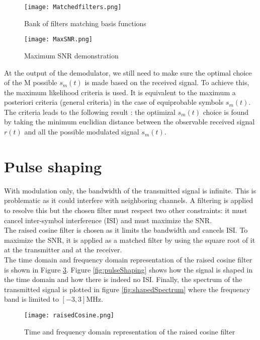  \begin{figure}[H]
    \centering
    \texttt{[image: Matchedfilters.png]}
    \caption{Bank of filters matching basis functions}
    \label{fig:Matchedfilters}
\end{figure}

\begin{figure}[H]
    \centering
    \texttt{[image: MaxSNR.png]}
    \caption{Maximum SNR demonstration}
    \label{fig:MaxSNR}
\end{figure}

At the output of the demodulator, we still need to make sure the optimal choice of the M possible $s_m(t)$ is made based on the received signal.
To achieve this, the maximum likelihood criteria is used. It is equivalent to the maximum a posteriori criteria (general criteria) in the case of equiprobable symbols $s_m(t)$.
The criteria leads to the following result : the optimizal $s_m(t)$ choice is found by taking the minimum euclidian distance between the observable received signal $r(t)$ 
and all the possible modulated signal $s_m(t)$.

\section{Pulse shaping}

With modulation only, the bandwidth of the transmitted signal is infinite. This is problematic as it could interfere with neighboring channels. A filtering is applied to resolve this but the chosen filter must respect two other constraints: it must cancel inter-symbol interference (ISI) and must maximize the SNR. \\
The raised cosine filter is chosen as it limits the bandwidth and cancels ISI. To maximize the SNR, it is applied as a matched filter by using the square root of it at the transmitter and at the receiver. \\
The time domain and frequency domain representation of the raised cosine filter is shown in Figure \ref{fig:raisedCosine}. Figure \ref{fig:pulseShaping} shows how the signal is shaped in the time domain and how there is indeed no ISI. Finally, the spectrum of the transmitted signal is plotted in figure \ref{fig:shapedSpectrum} where the frequency band is limited to $[-3, 3]$MHz. \\

\begin{figure}[H]
    \centering
    \texttt{[image: raisedCosine.png]}
    \caption{Time and frequency domain representation of the raised cosine filter}
    \label{fig:raisedCosine}
\end{figure}

